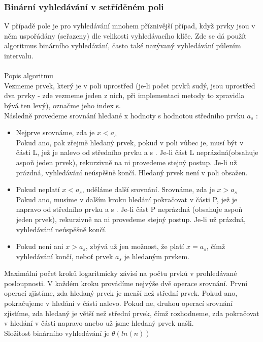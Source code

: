 \documentclass[10pt,a4paper]{article}
\begin{document}
\subsubsection{Binární vyhledávání v setříděném poli}
V případě pole je pro vyhledávání mnohem příznivější případ, když prvky jsou v něm uspořádány (seřazeny) dle velikosti vyhledávacího klíče.
Zde se dá použít algoritmus binárního vyhledávání, často také nazývaný vyhledávání půlením intervalu. \\ \\
Popis algoritmu \\
Vezmeme prvek, který je v poli uprostřed (je-li počet prvků sudý, jsou uprostřed dva prvky - zde vezmeme jeden z nich, při implementaci metody to zpravidla bývá ten levý), označme jeho index s. \\
Následně provedeme srovnání hledané x hodnoty s hodnotou středního prvku $a_s$ :
\begin{itemize}
	\item Nejprve srovnáme, zda je $x < a_s$ \\
	Pokud ano, pak zřejmě hledaný prvek, pokud v poli vůbec je, musí být v části L, jež je nalevo od středního prvku a s . Je-li část L neprázdná(obsahuje aspoň jeden prvek), rekurzivně na ni provedeme stejný postup. Je-li už prázdná, vyhledávání neúspěšně končí. Hledaný prvek není v poli obsažen.
	\item Pokud neplatí $x < a_s$, uděláme další srovnání. Srovnáme, zda je $x > a_s$ \\
	Pokud ano, musíme v dalším kroku hledání pokračovat v části P, jež je napravo od středního prvku a s . Je-li část P neprázdná (obsahuje aspoň jeden prvek), rekurzivně na ni provedeme stejný postup. Je-li už prázdná, vyhledávání neúspěšně končí.
	\item Pokud není ani $x > a_s$, zbývá už jen možnost, že platí $x = a_s$, čímž vyhledávání končí, neboť prvek $a_s$ je hledaným prvkem.
\end{itemize}
Maximální počet kroků logaritmicky závisí na počtu prvků v prohledávané posloupnosti. V každém kroku provádíme nejvýše dvě operace srovnání. První operací zjistíme, zda hledaný prvek je menší než střední prvek. Pokud ano, pokračujeme v hledání v části nalevo. Pokud ne, druhou operací srovnání zjistíme, zda hledaný je větší než střední prvek, čímž rozhodneme, zda pokračovat v hledání v části napravo anebo už jsme hledaný prvek našli. \\
Složitost binárního vyhledávání je $\theta(ln(n))$
\end{document}
